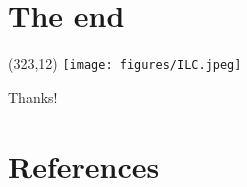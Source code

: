 \documentclass[xcolor={dvipsnames}]{beamer}
\newcommand{\ilclogo}{
  \setlength{\TPHorizModule}{1pt}
  \setlength{\TPVertModule}{1pt}
  \begin{textblock}{1}(323,12)
   \texttt{[image: figures/ILC.jpeg]}
  \end{textblock}
}
\begin{document}
\section*{The end}
{
\begin{frame}
\ilclogo
\begin{center}
\textcolor{RubineRed}{
	\LARGE Thanks!\\
}
\end{center}
\end{frame}
}

\section*{References}
\end{document}

